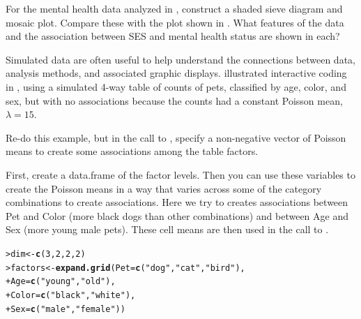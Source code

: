 \documentclass[10pt]{report}\usepackage[]{graphicx}\usepackage[]{color}
\makeatletter
\newcommand{\hlnum}[1]{\textcolor[rgb]{0.686,0.059,0.569}{#1}}%
\newcommand{\hlstr}[1]{\textcolor[rgb]{0.192,0.494,0.8}{#1}}%
\newcommand{\hlstd}[1]{\textcolor[rgb]{0.345,0.345,0.345}{#1}}%
\newcommand{\hlkwb}[1]{\textcolor[rgb]{0.69,0.353,0.396}{#1}}%
\newcommand{\hlkwc}[1]{\textcolor[rgb]{0.333,0.667,0.333}{#1}}%
\newcommand{\hlkwd}[1]{\textcolor[rgb]{0.737,0.353,0.396}{\textbf{#1}}}%
\newenvironment{kframe}{%
 \def\at@end@of@kframe{}%
 \ifinner\ifhmode%
  \def\at@end@of@kframe{\end{minipage}}%
  \begin{minipage}{\columnwidth}%
 \fi\fi%
 \def\FrameCommand##1{\hskip\@totalleftmargin \hskip-\fboxsep
 \colorbox{shadecolor}{##1}\hskip-\fboxsep
     \hskip-\linewidth \hskip-\@totalleftmargin \hskip\columnwidth}%
 \MakeFramed {\advance\hsize-\width
   \@totalleftmargin\z@ \linewidth\hsize
   \@setminipage}}%
 {\par\unskip\endMakeFramed%
 \at@end@of@kframe}
\newenvironment{knitrout}{}{} %
\renewenvironment{knitrout}{\small\renewcommand{\baselinestretch}{.85}}{} %
\makeatother
\begin{document}
\begin{Exercises}
\begin{enumerate*}
  \end{enumerate*}
  
  \exercise For the mental health data analyzed in , construct a shaded sieve diagram
  and mosaic plot. Compare these with the \ca plot shown in .  What features of
  the data and the association between SES and mental health status are shown in each?
  \begin{ans}
  \end{ans}
  
  
  \exercise Simulated data are often useful to help understand the connections between data, analysis
  methods, and associated graphic displays.
   illustrated interactive coding in \R, using a simulated 4-way table
  of counts of pets, classified by age, color, and sex, but with no associations because the counts had
  a constant Poisson mean, $\lambda=15$. 
  \begin{enumerate*}
    \item Re-do this example, but in the call to , specify
    a non-negative vector of Poisson means to create some associations among the table factors.
    \begin{ans}
    First, create a data.frame of the factor levels.  Then you can use these
    variables to create the Poisson means in a way that varies across some of
    the category combinations to create associations.  Here we try to creates
    associations between Pet and Color (more black dogs than other combinations)
    and between Age and Sex (more young male pets).  These cell means are
    then used in the call to .
\begin{knitrout}\footnotesize
{}\color{fgcolor}\begin{kframe}
\begin{alltt}
\hlstd{> }\hlstd{dim} \hlkwb{<-} \hlkwd{c}\hlstd{(}\hlnum{3}\hlstd{,} \hlnum{2}\hlstd{,} \hlnum{2}\hlstd{,} \hlnum{2}\hlstd{)}
\hlstd{> }\hlstd{factors} \hlkwb{<-} \hlkwd{expand.grid}\hlstd{(}\hlkwc{Pet}\hlstd{=}\hlkwd{c}\hlstd{(}\hlstr{"dog"}\hlstd{,}\hlstr{"cat"}\hlstd{,}\hlstr{"bird"}\hlstd{),}
\hlstd{+ }                      \hlkwc{Age}\hlstd{=}\hlkwd{c}\hlstd{(}\hlstr{"young"}\hlstd{,}\hlstr{"old"}\hlstd{),}
\hlstd{+ }                      \hlkwc{Color}\hlstd{=}\hlkwd{c}\hlstd{(}\hlstr{"black"}\hlstd{,} \hlstr{"white"}\hlstd{),}
\hlstd{+ }                      \hlkwc{Sex}\hlstd{=}\hlkwd{c}\hlstd{(}\hlstr{"male"}\hlstd{,} \hlstr{"female"}\hlstd{))}

\end{alltt}
\end{kframe}
\end{knitrout}
\end{ans}
\end{enumerate*}
\end{Exercises}
\end{document}

